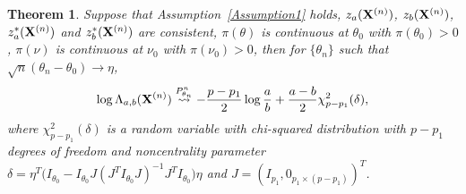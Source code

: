 \documentclass[3p]{elsarticle}
\theoremstyle{plain}
\newtheorem{theorem}{\quad\quad Theorem}
\theoremstyle{definition}
\theoremstyle{remark}
\begin{document}
    \begin{theorem}\label{Thm:maintheorem}
        Suppose that Assumption~\ref{Assumption1} holds, $z_a(\mathbf{X}^{(n)})$, $z_b(\mathbf{X}^{(n)})$, $z_a^*(\mathbf{X}^{(n)})$ and $z_b^*(\mathbf{X}^{(n)})$ are consistent, $\pi(\theta)$ is continuous at $\theta_0$ with $\pi(\theta_0)>0$, $\pi(\nu)$ is continuous at $\nu_0$ with $\pi(\nu_0)>0$, then
        for $\{\theta_n\}$ such that $\sqrt{n}(\theta_n-\theta_0)\to \eta$, 
        $$
        \log \Lambda_{a,b}(\mathbf{X}^{(n)})\overset{P^n_{\theta_n}}{\rightsquigarrow}-\frac{p-p_1}{2}\log \frac{a}{b}+\frac{a-b}{2}\chi^2_{p-p_1}(\delta),
        $$
        where $\chi^2_{p-p_1}(\delta)$ is a random variable with chi-squared distribution with $p-p_1$ degrees of freedom and noncentrality parameter $\delta=\eta^T\big( I_{\theta_0}-I_{\theta_0} J(J^T I_{\theta_0} J)^{-1}J^T I_{\theta_0}\big)\eta$ and $J=(I_{p_1},0_{p_1\times(p-p_1)})^T$.


    \end{theorem}
\end{document}
